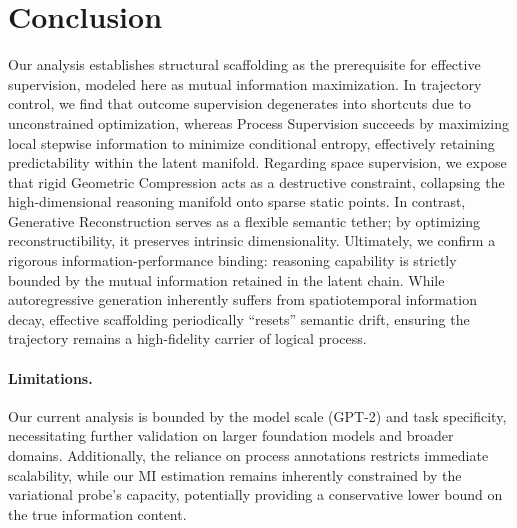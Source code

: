 
\section{Conclusion}
\label{sec:discussion}

Our analysis establishes structural scaffolding as the prerequisite for effective supervision, modeled here as mutual information maximization. In trajectory control, we find that outcome supervision degenerates into shortcuts due to unconstrained optimization, whereas Process Supervision succeeds by maximizing local stepwise information to minimize conditional entropy, effectively retaining predictability within the latent manifold. 
Regarding space supervision, we expose that rigid Geometric Compression acts as a destructive constraint, collapsing the high-dimensional reasoning manifold onto sparse static points. In contrast, Generative Reconstruction serves as a flexible semantic tether; by optimizing reconstructibility, it preserves intrinsic dimensionality. 
Ultimately, we confirm a rigorous information-performance binding: reasoning capability is strictly bounded by the mutual information retained in the latent chain. While autoregressive generation inherently suffers from spatiotemporal information decay, effective scaffolding periodically ``resets'' semantic drift, ensuring the trajectory remains a high-fidelity carrier of logical process.

\paragraph{Limitations.}
Our current analysis is bounded by the model scale (GPT-2) and task specificity, necessitating further validation on larger foundation models and broader domains. Additionally, the reliance on process annotations restricts immediate scalability, while our MI estimation remains inherently constrained by the variational probe's capacity, potentially providing a conservative lower bound on the true information content.
